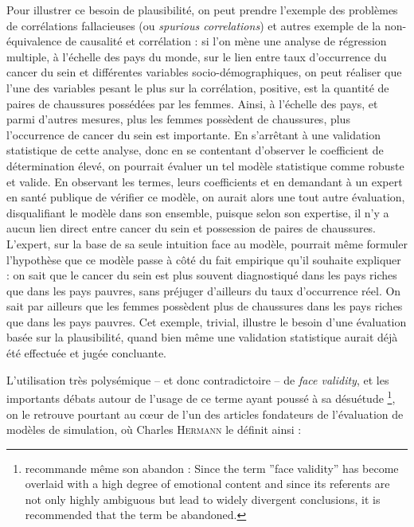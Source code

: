 Pour illustrer ce besoin de \og plausibilité\fg{}, on peut prendre l'exemple des problèmes de corrélations fallacieuses (ou \og \textit{spurious correlations}\fg{}) et autres exemple de la non-équivalence de causalité et corrélation :
si l'on mène une analyse de régression multiple, à l'échelle des pays du monde, sur le lien entre taux d'occurrence du cancer du sein et différentes variables socio-démographiques, on peut réaliser que l'une des variables pesant le plus sur la corrélation, positive, est la quantité de paires de chaussures possédées par les femmes.
Ainsi, à l'échelle des pays, et parmi d'autres mesures, plus les femmes possèdent de chaussures, plus l'occurrence de cancer du sein est importante.
En s'arrêtant à une validation statistique de cette analyse, donc en se contentant d'observer le coefficient de détermination élevé, on pourrait évaluer un tel modèle statistique comme robuste et valide.
En observant les termes, leurs coefficients et en demandant à un expert en santé publique de vérifier ce modèle, on aurait alors une tout autre évaluation, disqualifiant le modèle dans son ensemble, puisque selon son expertise, il n'y a aucun lien direct entre cancer du sein et possession de paires de chaussures.
L'expert, sur la base de sa seule intuition face au modèle, pourrait même formuler l'hypothèse que ce modèle passe à côté du fait empirique qu'il souhaite expliquer : on sait que le cancer du sein est plus souvent diagnostiqué dans les pays riches que dans les pays pauvres, sans préjuger d'ailleurs du taux d'occurrence réel.
On sait par ailleurs que les femmes possèdent plus de chaussures dans les pays riches que dans les pays pauvres.
Cet exemple, trivial, illustre le besoin d'une évaluation basée sur la plausibilité, quand bien même une validation statistique aurait déjà été effectuée et jugée concluante.



L'utilisation très polysémique -- et donc contradictoire -- de \og \textit{face validity}\fg{}, et les importants débats autour de l'usage de ce terme ayant poussé à sa désuétude
\footnote{
	\cite[205]{mosier_critical_1947} recommande même son abandon : \og Since the term ''face validity'' has become overlaid with a high degree of emotional content and since its referents are not only highly ambiguous but lead to widely divergent conclusions, it is recommended that the term be abandoned.\fg{}
}, on le retrouve pourtant au cœur de l'un des articles fondateurs de l'évaluation de modèles de simulation, où Charles H\textsc{ermann} le définit ainsi :

